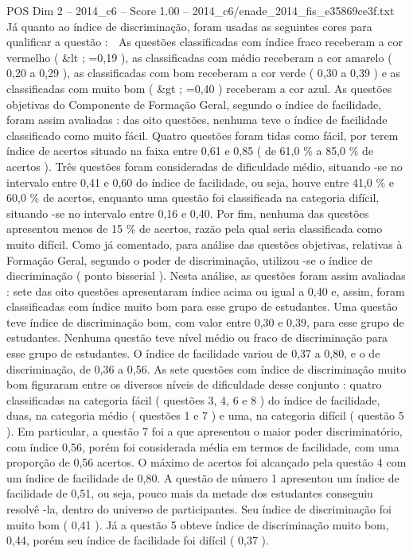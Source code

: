 \begin{textsample}{POS Dim 2 – 2014\_c6 – Score 1.00 – 2014\_c6/enade\_2014\_fis\_e35869ce3f.txt}
Já quanto ao índice de discriminação, foram usadas as seguintes cores para qualificar a questão :  As questões classificadas com índice fraco receberam a cor vermelho ( \&lt ; =0,19 ), as classificadas com médio receberam a cor amarelo ( 0,20 a 0,29 ), as classificadas com bom receberam a cor verde ( 0,30 a 0,39 ) e as classificadas com muito bom ( \&gt ; =0,40 ) receberam a cor azul.
As questões objetivas do Componente de Formação Geral, segundo o índice de facilidade, foram assim avaliadas : das oito questões, nenhuma teve o índice de facilidade classificado como muito fácil.
Quatro questões foram tidas como fácil, por terem índice de acertos situado na faixa entre 0,61 e 0,85 ( de 61,0 \% a 85,0 \% de acertos ).
Três questões foram consideradas de dificuldade médio, situando -se no intervalo entre 0,41 e 0,60 do índice de facilidade, ou seja, houve entre 41,0 \% e 60,0 \% de acertos, enquanto uma questão foi classificada na categoria difícil, situando -se no intervalo entre 0,16 e 0,40.
Por fim, nenhuma das questões apresentou menos de 15 \% de acertos, razão pela qual seria classificada como muito difícil.
Como já comentado, para análise das questões objetivas, relativas à Formação Geral, segundo o poder de discriminação, utilizou -se o índice de discriminação ( ponto bisserial ).
Nesta análise, as questões foram assim avaliadas : sete das oito questões apresentaram índice acima ou igual a 0,40 e, assim, foram classificadas com índice muito bom para esse grupo de estudantes.
Uma questão teve índice de discriminação bom, com valor entre 0,30 e 0,39, para esse grupo de estudantes.
Nenhuma questão teve nível médio ou fraco de discriminação para esse grupo de estudantes.
O índice de facilidade variou de 0,37 a 0,80, e o de discriminação, de 0,36 a 0,56.
As sete questões com índice de discriminação muito bom figuraram entre os diversos níveis de dificuldade desse conjunto : quatro classificadas na categoria fácil ( questões 3, 4, 6 e 8 ) do índice de facilidade, duas, na categoria médio ( questões 1 e 7 ) e uma, na categoria difícil ( questão 5 ).
Em particular, a questão 7 foi a que apresentou o maior poder discriminatório, com índice 0,56, porém foi considerada média em termos de facilidade, com uma proporção de 0,56 acertos.
O máximo de acertos foi alcançado pela questão 4 com um índice de facilidade de 0,80.
A questão de número 1 apresentou um índice de facilidade de 0,51, ou seja, pouco mais da metade dos estudantes conseguiu resolvê -la, dentro do universo de participantes.
Seu índice de discriminação foi muito bom ( 0,41 ).
Já a questão 5 obteve índice de discriminação muito bom, 0,44, porém seu índice de facilidade foi difícil ( 0,37 ).

\end{textsample}
